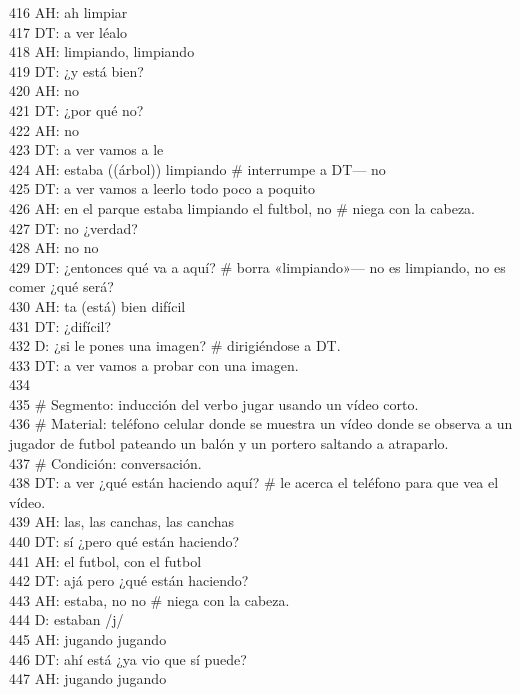 416 AH: ah limpiar\\
417 DT: a ver léalo\\
418 AH: limpiando, limpiando\\
419 DT: ¿y está bien?\\
420 AH: no\\
421 DT: ¿por qué no?\\
422 AH: no\\
423 DT: a ver vamos a le\\
424 AH: estaba ((árbol)) limpiando \# interrumpe a DT--- no\\
425 DT: a ver vamos a leerlo todo poco a poquito\\
426 AH: en el parque estaba limpiando el fultbol, no \# niega con la cabeza.\\
427 DT: no ¿verdad?\\
428 AH: no no\\
429 DT: ¿entonces qué va a aquí? \# borra «limpiando»--- no es limpiando, no es comer ¿qué será?\\
430 AH: ta (está) bien difícil\\
431 DT: ¿difícil?\\
432 D: ¿si le pones una imagen? \# dirigiéndose a DT.\\
433 DT: a ver vamos a probar con una imagen.\\
434 \\
435 \# Segmento: inducción del verbo jugar usando un vídeo corto.\\
436 \# Material: teléfono celular donde se muestra un vídeo donde se observa a un jugador de futbol pateando un balón y un portero saltando a atraparlo.\\
437 \# Condición: conversación.\\
438 DT: a ver ¿qué están haciendo aquí? \# le acerca el teléfono para que vea el vídeo.\\
439 AH: las, las canchas, las canchas\\
440 DT: sí ¿pero qué están haciendo?\\
441 AH: el futbol, con el futbol\\
442 DT: ajá pero ¿qué están haciendo?\\
443 AH: estaba, no no \# niega con la cabeza.\\
444 D: estaban /j/\\
445 AH: jugando jugando\\
446 DT: ahí está ¿ya vio que sí puede?\\
447 AH: jugando jugando\\
